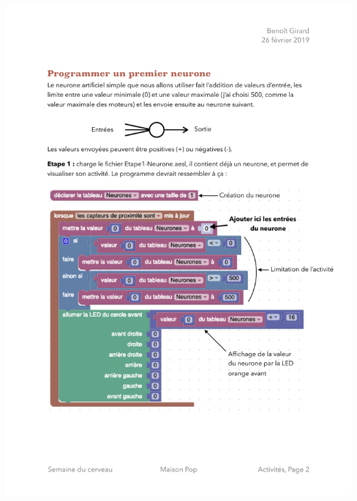 \documentclass[12pt]{article}
\begin{document}
\begin{center}
\includegraphics[width=\textwidth]{../ProgrammeEtape1.pdf}
\end{center}
\end{document}
